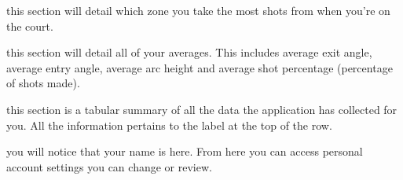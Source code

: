 \begin{enumerate}[{[1]}]
\item this section will detail which zone you take the most shots from when you're on the court.
\item this section will detail all of your averages. This includes average exit angle, average entry angle, average arc height and average shot percentage (percentage of shots made).
\item this section is a tabular summary of all the data the application has collected for you. All the information pertains to the label at the top of the row.
\item you will notice that your name is here. From here you can access personal account settings you can change or review.
\end{enumerate}